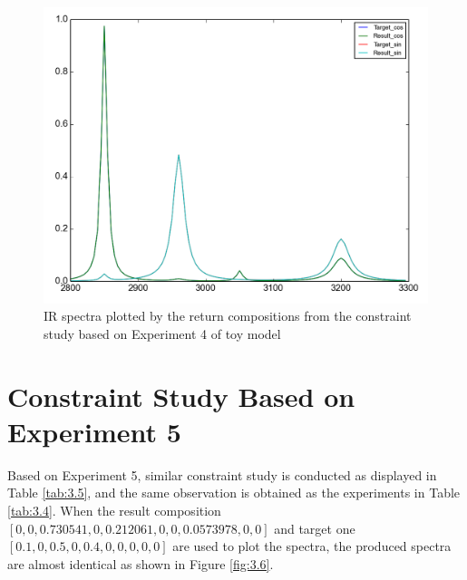 \begin{figure}[!ht] 
\centering
\includegraphics[scale=0.3]{Figures/toy_model_result_plotting_ir_sin_4candi_constraint_study_experiment4.png} 
\caption{IR spectra plotted by the return compositions from the constraint study based on Experiment 4 of toy model}\label{fig:3.5}
\end{figure}


\section{Constraint Study Based on Experiment 5}

Based on Experiment 5, similar constraint study is conducted as displayed in Table \ref{tab:3.5}, and the same observation is obtained as the experiments in Table \ref{tab:3.4}. When the result composition $[0, 0, 0.730541, 0, 0.212061,0, 0, 0.0573978, 0, 0]$ and target one $[0.1, 0, 0.5, 0, 0.4, 0, 0, 0, 0, 0]$ are used to plot the spectra, the produced spectra are almost identical as shown in Figure \ref{fig:3.6}.


